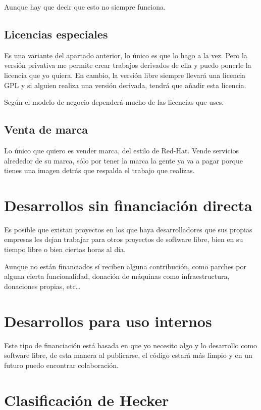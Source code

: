 Aunque hay que decir que esto no siempre funciona.

\subsection{Licencias especiales}
Es una variante del apartado anterior, lo único es que lo hago a la vez.
Pero la versión privativa me permite crear trabajos
derivados de ella y puedo ponerle la licencia que yo quiera. En cambio, la
versión libre siempre llevará una licencia GPL y si alguien realiza una versión
derivada, tendrá que añadir esta licencia.

Según el modelo de negocio dependerá mucho de las licencias que uses.

\subsection{Venta de marca}
Lo único que quiero es vender marca, del estilo de Red-Hat. Vende servicios
alrededor de su marca, sólo por tener la marca la gente ya va a pagar porque
tienes una imagen detrás que respalda el trabajo que realizas.

\section{Desarrollos sin financiación directa}
Es posible que existan proyectos en los que haya desarrolladores que sus
propias empresas les dejan trabajar para otros proyectos de software libre, bien
en su tiempo libre o bien ciertas horas al día.

Aunque no están financiados sí reciben alguna contribución, como parches por
alguna cierta funcionalidad, donación de máquinas como infraestructura,
donaciones propias, etc\ldots


\section{Desarrollos para uso internos}
Este tipo de financiación está basada en que yo necesito algo y lo desarrollo como
software libre, de esta manera al publicarse, el código estará más limpio y en un
futuro puedo encontrar colaboración.


\section{Clasificación de Hecker}

